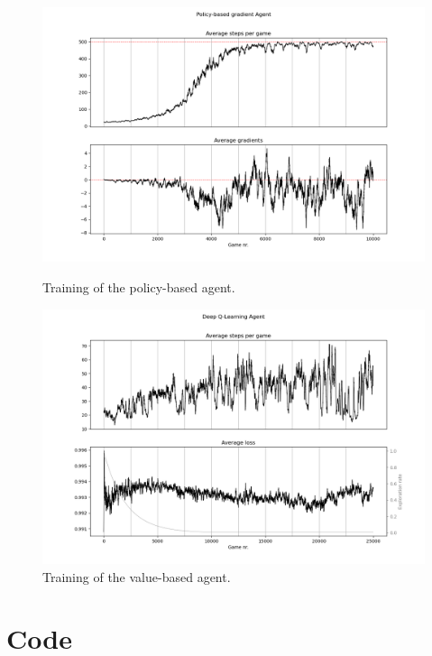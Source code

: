 \documentclass{article}
\begin{document}
\begin{figure}[h]
    \centering
    \begin{minipage}{0.5\textwidth}
        \centering
        \includegraphics[width=\linewidth]{images/policy-based-gradient.png}
        \caption{Training of the policy-based agent.}
        \label{fig:policy-based-metrics}
    \end{minipage}\hfill
    \begin{minipage}{0.5\textwidth}
        \centering
        \includegraphics[width=\linewidth]{images/deep-q-agent.png}
        \caption{Training of the value-based agent.}
        \label{fig:value-based-metrics}
    \end{minipage}
\end{figure}

\newpage
\hypertarget{sec:code}{}
\section*{Code}
\end{document}
